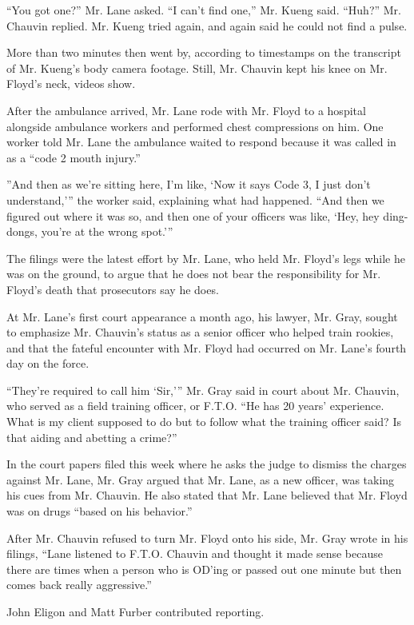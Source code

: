 ``You got one?'' Mr. Lane asked. ``I can't find one,'' Mr. Kueng said.
``Huh?'' Mr. Chauvin replied. Mr. Kueng tried again, and again said he
could not find a pulse.

More than two minutes then went by, according to timestamps on the
transcript of Mr. Kueng's body camera footage. Still, Mr. Chauvin kept
his knee on Mr. Floyd's neck, videos show.

After the ambulance arrived, Mr. Lane rode with Mr. Floyd to a hospital
alongside ambulance workers and performed chest compressions on him. One
worker told Mr. Lane the ambulance waited to respond because it was
called in as a ``code 2 mouth injury.''

''And then as we're sitting here, I'm like, `Now it says Code 3, I just
don't understand,''' the worker said, explaining what had happened.
``And then we figured out where it was so, and then one of your officers
was like, `Hey, hey ding-dongs, you're at the wrong spot.'''

The filings were the latest effort by Mr. Lane, who held Mr. Floyd's
legs while he was on the ground, to argue that he does not bear the
responsibility for Mr. Floyd's death that prosecutors say he does.

At Mr. Lane's first court appearance a month ago, his lawyer, Mr. Gray,
sought to emphasize Mr. Chauvin's status as a senior officer who helped
train rookies, and that the fateful encounter with Mr. Floyd had
occurred on Mr. Lane's fourth day on the force.

``They're required to call him `Sir,''' Mr. Gray said in court about Mr.
Chauvin, who served as a field training officer, or F.T.O. ``He has 20
years' experience. What is my client supposed to do but to follow what
the training officer said? Is that aiding and abetting a crime?''

In the court papers filed this week where he asks the judge to dismiss
the charges against Mr. Lane, Mr. Gray argued that Mr. Lane, as a new
officer, was taking his cues from Mr. Chauvin. He also stated that Mr.
Lane believed that Mr. Floyd was on drugs ``based on his behavior.''

After Mr. Chauvin refused to turn Mr. Floyd onto his side, Mr. Gray
wrote in his filings, ``Lane listened to F.T.O. Chauvin and thought it
made sense because there are times when a person who is OD'ing or passed
out one minute but then comes back really aggressive.''

John Eligon and Matt Furber contributed reporting.

